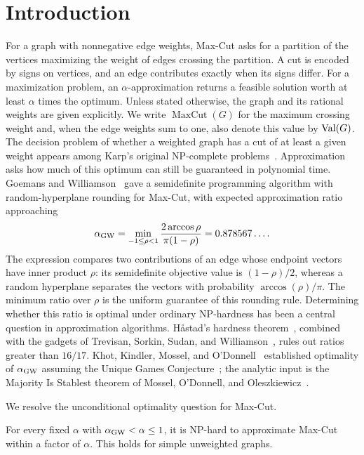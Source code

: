 \section{Introduction}

For a graph with nonnegative edge weights, Max-Cut asks for a partition of the
vertices maximizing the weight of edges crossing the partition. A cut is
encoded by signs on vertices, and an edge contributes exactly when its signs
differ. For a maximization problem, an $\alpha$-approximation returns a
feasible solution worth at least $\alpha$ times the optimum. Unless stated
otherwise, the graph and its rational weights are given explicitly.
We write $\operatorname{MaxCut}(G)$ for the maximum crossing weight and,
when the edge weights sum to one, also denote this value by $\operatorname{Val}(G)$.
The decision problem of whether a weighted graph has a cut of at least a
given weight appears among Karp's original NP-complete
problems~\cite{Karp72}. Approximation asks how much of this optimum can
still be guaranteed in polynomial time.
Goemans and Williamson~\cite{GW95} gave a semidefinite programming algorithm with random-hyperplane rounding
for Max-Cut, with expected approximation ratio approaching
\begin{equation}\label{eq:gw-constant}
 \alpha_{\mathrm{GW}}=\min_{-1\le \rho<1}
 \frac{2\arccos\rho}{\pi(1-\rho)}
 =0.878567\ldots.
\end{equation}
The expression compares two contributions of an edge whose endpoint
vectors have inner product $\rho$: its semidefinite objective value is
$(1-\rho)/2$, whereas a random hyperplane separates the vectors with
probability $\arccos(\rho)/\pi$. The minimum ratio over $\rho$ is the
uniform guarantee of this rounding rule.
Determining whether this ratio is optimal under ordinary NP-hardness has
been a central question in approximation algorithms. H\aa stad's
hardness theorem~\cite{Hastad01}, combined with the gadgets of
Trevisan, Sorkin, Sudan, and Williamson~\cite{TSSW00}, rules out ratios
greater than $16/17$.
Khot, Kindler, Mossel, and O'Donnell~\cite{KKMO07} established optimality of
$\alpha_{\mathrm{GW}}$ assuming the Unique Games Conjecture~\cite{Khot02}; the analytic input
is the Majority Is Stablest theorem of Mossel, O'Donnell, and
Oleszkiewicz~\cite{MOO10}.

We resolve the unconditional optimality question for Max-Cut.

\begin{theorem}\label{thm:main}
For every fixed $\alpha$ with $\alpha_{\mathrm{GW}}<\alpha\le1$, it is NP-hard to approximate
Max-Cut within a factor of $\alpha$. This holds for simple unweighted graphs.
\end{theorem}

